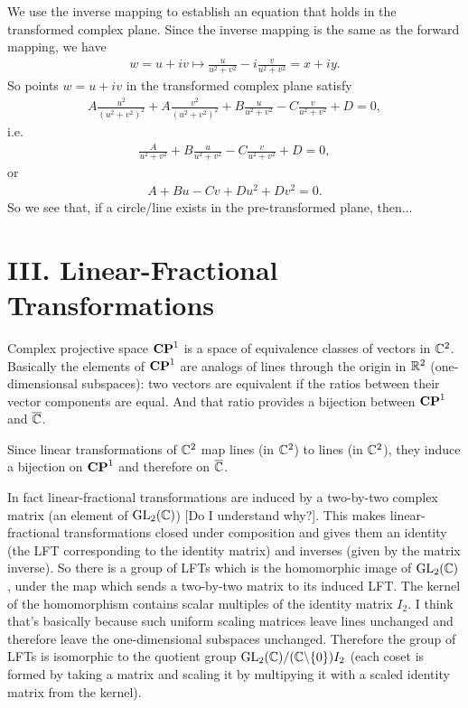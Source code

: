 \documentclass[12pt]{article}
\renewcommand{\bar}{\overline}
\begin{document}
We use the inverse mapping to establish an equation that holds in the
transformed complex plane. Since the inverse mapping is the same as the forward
mapping, we have
\begin{align*}
  w = u + iv \mapsto \frac{u}{u^2 + v^2} - i\frac{v}{u^2 + v^2} = x + iy.
\end{align*}
So points $w = u + iv$ in the transformed complex plane satisfy
\begin{align*}
  A\frac{u^2}{(u^2 + v^2)^2} + A\frac{v^2}{(u^2 + v^2)^2} + B\frac{u}{u^2 + v^2} - C\frac{v}{u^2 + v^2} + D  = 0,
\end{align*}
i.e.
\begin{align*}
  \frac{A}{u^2 + v^2} + B\frac{u}{u^2 + v^2} - C\frac{v}{u^2 + v^2} + D  = 0,
\end{align*}
or
\begin{align*}
  A + Bu - Cv + Du^2 + Dv^2  = 0.
\end{align*}
So we see that, if a circle/line exists in the pre-transformed plane, then...



\section*{III. Linear-Fractional Transformations}

Complex projective space $\textbf{CP}^1$ is a space of equivalence classes of vectors
in $\mathbb{C}^2$. Basically the elements of $\textbf{CP}^1$ are analogs of lines through the
origin in $\mathbb{R}^2$ (one-dimensionsal subspaces): two vectors are equivalent if
the ratios between their vector components are equal. And that ratio provides a
bijection between $\textbf{CP}^1$ and $\bar \C$.

Since linear transformations of $\mathbb{C}^2$ map lines (in $\mathbb{C}^2$) to lines (in
$\mathbb{C}^2$), they induce a bijection on $\textbf{CP}^1$ and therefore on $\bar \C$.

In fact linear-fractional transformations are induced by a two-by-two complex
matrix (an element of $\mathrm{GL}_{2}(\mathbb{C})$) [Do I understand why?]. This makes
linear-fractional transformations closed under composition and gives them an
identity (the LFT corresponding to the identity matrix) and inverses (given by
the matrix inverse). So there is a group of LFTs which is the homomorphic image
of $\mathrm{GL}_{2}(\mathbb{C})$, under the map which sends a two-by-two matrix to its induced
LFT. The kernel of the homomorphism contains scalar multiples of the identity
matrix $I_2$. I think that's basically because such uniform scaling matrices
leave lines unchanged and therefore leave the one-dimensional subspaces
unchanged. Therefore the group of LFTs is isomorphic to the quotient group
$\mathrm{GL}_{2}(\mathbb{C})/(\mathbb{C}\backslash\{0\})I_2$ (each coset is formed by taking a matrix and
scaling it by multipying it with a scaled identity matrix from the kernel).
\end{document}
